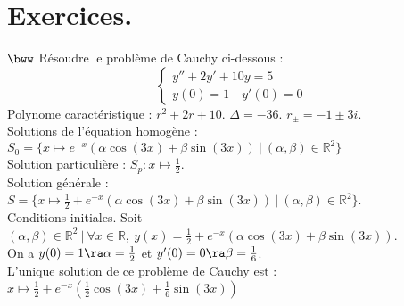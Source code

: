 \documentclass[11pt]{article}
\begin{document}
\section{Exercices.}

\begin{exercice}{$\bww$}{}
    Résoudre le problème de Cauchy ci-dessous :
    \begin{equation*}
        \begin{cases}
            y'' + 2y' + 10y = 5\\
            y(0) = 1 \quad y'(0) = 0
        \end{cases}
    \end{equation*}
    \tcblower
    Polynome caractéristique : $r^2 + 2r + 10$. $\Delta = -36$. $r_{\pm}=-1\pm3i$.\\
    Solutions de l'équation homogène : $S_0 = \{x\mapsto e^{-x}\left(\alpha\cos(3x) + \beta\sin(3x)\right) ~ | ~ (\alpha, \beta)\in\mathbb{R}^2\}$\\
    Solution particulière : $S_p : x\mapsto\frac{1}{2}$.\\
    Solution générale : $S = \{x\mapsto\frac{1}{2} + e^{-x}\left( \alpha\cos(3x) + \beta\sin(3x) \right) ~ | ~ (\alpha, \beta) \in \mathbb{R}^2\}$.\\
    Conditions initiales. Soit $(\alpha, \beta)\in\mathbb{R}^2 ~ | ~ \forall{x\in\mathbb{R}, ~ y(x)=\frac{1}{2} + e^{-x}\left( \alpha\cos(3x) + \beta\sin(3x) \right)}$.\\
    On a $y(0)=1 \ra \alpha = \frac{1}{2}$ et $y'(0)=0 \ra \beta = \frac{1}{6}$.\\
    L'unique solution de ce problème de Cauchy est : $x\mapsto\frac{1}{2} + e^{-x}\left( \frac{1}{2}\cos(3x) + \frac{1}{6}\sin(3x) \right)$
\end{exercice}
\end{document}
